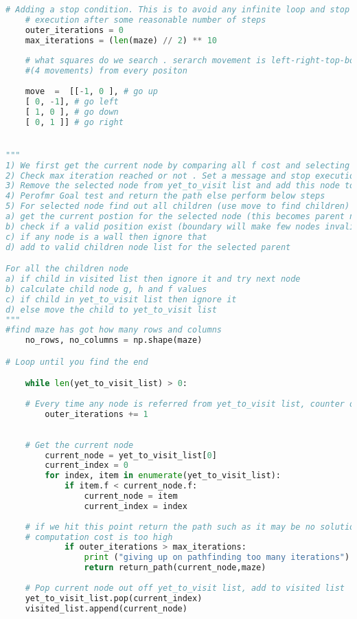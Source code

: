 \begin{appendices}
\begin{lstlisting}[language=Python]
	# Adding a stop condition. This is to avoid any infinite loop and stop
	# execution after some reasonable number of steps
	outer_iterations = 0
	max_iterations = (len(maze) // 2) ** 10
	
	# what squares do we search . serarch movement is left-right-top-bottom
	#(4 movements) from every positon
	
	move  =  [[-1, 0 ], # go up
	[ 0, -1], # go left
	[ 1, 0 ], # go down
	[ 0, 1 ]] # go right


"""
1) We first get the current node by comparing all f cost and selecting the lowest cost node for further expansion
2) Check max iteration reached or not . Set a message and stop execution
3) Remove the selected node from yet_to_visit list and add this node to visited list
4) Perofmr Goal test and return the path else perform below steps
5) For selected node find out all children (use move to find children)
a) get the current postion for the selected node (this becomes parent node for the children)
b) check if a valid position exist (boundary will make few nodes invalid)
c) if any node is a wall then ignore that
d) add to valid children node list for the selected parent

For all the children node
a) if child in visited list then ignore it and try next node
b) calculate child node g, h and f values
c) if child in yet_to_visit list then ignore it
d) else move the child to yet_to_visit list
"""
#find maze has got how many rows and columns
	no_rows, no_columns = np.shape(maze)

# Loop until you find the end

	while len(yet_to_visit_list) > 0:
	
	# Every time any node is referred from yet_to_visit list, counter of limit operation incremented
		outer_iterations += 1
	
	
	# Get the current node
		current_node = yet_to_visit_list[0]
		current_index = 0
		for index, item in enumerate(yet_to_visit_list):
			if item.f < current_node.f:
				current_node = item
				current_index = index
	
	# if we hit this point return the path such as it may be no solution or
	# computation cost is too high
			if outer_iterations > max_iterations:
				print ("giving up on pathfinding too many iterations")
				return return_path(current_node,maze)
	
	# Pop current node out off yet_to_visit list, add to visited list
	yet_to_visit_list.pop(current_index)
	visited_list.append(current_node)
	

\end{lstlisting}
\end{appendices}
